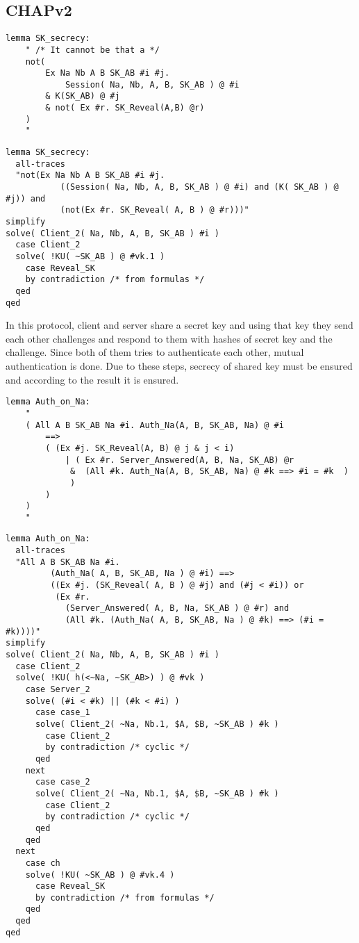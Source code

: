 \documentclass[a4paper, 12pt, titlepage]{article}
\begin{document}
\subsection{CHAPv2}
\begin{lstlisting}[caption = Implementation of shared key secrecy lemma of CHAPv2 protocol]
lemma SK_secrecy:
	" /* It cannot be that a */
	not(
		Ex Na Nb A B SK_AB #i #j.
			Session( Na, Nb, A, B, SK_AB ) @ #i
		& K(SK_AB) @ #j
		& not( Ex #r. SK_Reveal(A,B) @r)
	)
	"
\end{lstlisting}
\begin{lstlisting}[caption = Execution results are positive for shared key secrecy lemma of CHAPv2 protocol]
lemma SK_secrecy:
  all-traces
  "not(Ex Na Nb A B SK_AB #i #j.
           ((Session( Na, Nb, A, B, SK_AB ) @ #i) and (K( SK_AB ) @ #j)) and
           (not(Ex #r. SK_Reveal( A, B ) @ #r)))"
simplify
solve( Client_2( Na, Nb, A, B, SK_AB ) #i )
  case Client_2
  solve( !KU( ~SK_AB ) @ #vk.1 )
    case Reveal_SK
    by contradiction /* from formulas */
  qed
qed
\end{lstlisting}
In this protocol, client and server share a secret key and using that key they send each other challenges and respond to them with hashes of secret key and the challenge. Since both of them tries to authenticate each other, mutual authentication is done. Due to these steps, secrecy of shared key must be ensured and according to the result it is ensured.
\begin{lstlisting}[caption = Implementation of N\textsubscript{a} strong authentication lemma of CHAPv2 protocol]
lemma Auth_on_Na:
	"
	( All A B SK_AB Na #i. Auth_Na(A, B, SK_AB, Na) @ #i
		==>
		( (Ex #j. SK_Reveal(A, B) @ j & j < i)
			| ( Ex #r. Server_Answered(A, B, Na, SK_AB) @r
			 &  (All #k. Auth_Na(A, B, SK_AB, Na) @ #k ==> #i = #k  )
			 )
		)
	)
	"
\end{lstlisting}
\begin{lstlisting}[caption = Execution results are positive for N\textsubscript{a} strong authentication lemma of CHAPv2 protocol]
lemma Auth_on_Na:
  all-traces
  "All A B SK_AB Na #i.
         (Auth_Na( A, B, SK_AB, Na ) @ #i) ==>
         ((Ex #j. (SK_Reveal( A, B ) @ #j) and (#j < #i)) or
          (Ex #r.
            (Server_Answered( A, B, Na, SK_AB ) @ #r) and
            (All #k. (Auth_Na( A, B, SK_AB, Na ) @ #k) ==> (#i = #k))))"
simplify
solve( Client_2( Na, Nb, A, B, SK_AB ) #i )
  case Client_2
  solve( !KU( h(<~Na, ~SK_AB>) ) @ #vk )
    case Server_2
    solve( (#i < #k) || (#k < #i) )
      case case_1
      solve( Client_2( ~Na, Nb.1, $A, $B, ~SK_AB ) #k )
        case Client_2
        by contradiction /* cyclic */
      qed
    next
      case case_2
      solve( Client_2( ~Na, Nb.1, $A, $B, ~SK_AB ) #k )
        case Client_2
        by contradiction /* cyclic */
      qed
    qed
  next
    case ch
    solve( !KU( ~SK_AB ) @ #vk.4 )
      case Reveal_SK
      by contradiction /* from formulas */
    qed
  qed
qed
\end{lstlisting}
\end{document}
